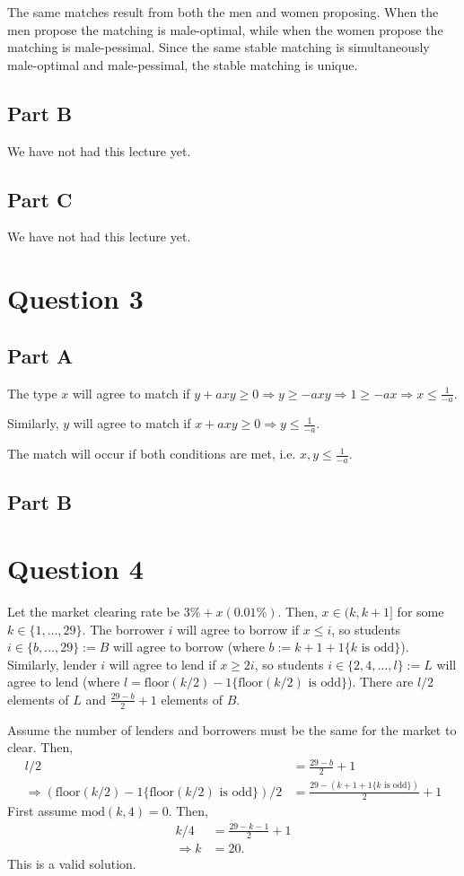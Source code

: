 \documentclass[11pt]{article} %
\begin{document}
The same matches result from both the men and women proposing. When the men propose the matching is male-optimal, while when the women propose the matching is male-pessimal. Since the same stable matching is simultaneously male-optimal and male-pessimal, the stable matching is unique.

\subsection{Part B}
We have not had this lecture yet.
\subsection{Part C}
We have not had this lecture yet.

\section{Question 3}
\subsection{Part A}
The type $x$ will agree to match if $y+axy\geq0 \Rightarrow y\geq -axy \Rightarrow 1\geq -ax \Rightarrow x\leq \frac{1}{-a}$.

Similarly, $y$ will agree to match if $x+axy \geq 0 \Rightarrow y\leq \frac{1}{-a}$.

The match will occur if both conditions are met, i.e. $x,y\leq \frac{1}{-a}.$

\subsection{Part B}
\section{Question 4}
Let the market clearing rate be  $3\%+x(0.01\%)$. Then, $x\in (k,k+1]$ for some $k \in \{1,\dots,29\}$. The borrower $i$ will agree to borrow if $x\leq i$, so students $i \in \{b, \dots, 29\}:= B$ will agree to borrow (where $b:= k +1 + 1\{k \text{ is odd}\}$). Similarly, lender $i$ will agree to lend if $x\geq 2i$, so students $i \in \{2,4,\dots,l\}:= L$ will agree to lend (where $l = \text{floor}(k/2) - 1\{ \text{floor}(k/2) \text{ is odd}\}$). There are $l/2$ elements of $L$ and $\frac{29-b}{2} + 1$ elements of $B$.

Assume the number of lenders and borrowers must be the same for the market to clear. Then,
\begin{align*}
l/2 &= \frac{29-b}{2} + 1\\
\Rightarrow  ( \text{floor}(k/2) - 1\{ \text{floor}(k/2) \text{ is odd}\})/2 &=  \frac{29-(k +1 + 1\{k \text{ is odd}\})}{2} + 1
\end{align*}
First assume $\text{mod}(k,4) = 0.$ Then, 
\begin{align*}
k/4 &= \frac{29 - k - 1}{2}+1\\
\Rightarrow k &= 20.
\end{align*}
This is a valid solution.
\end{document}
